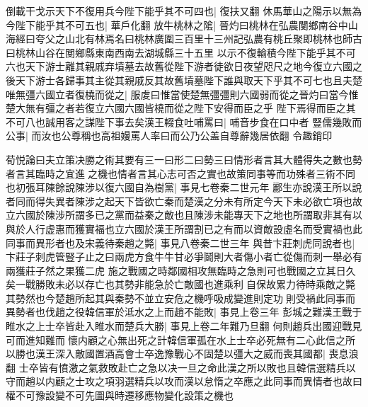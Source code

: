 倒載干戈示天下不復用兵今陛下能乎其不可四也|{
	復扶又翻}
休馬華山之陽示以無為今陛下能乎其不可五也|{
	華戶化翻}
放牛桃林之隂|{
	晉灼曰桃林在弘農閺鄉南谷中山海經曰夸父之山北有林焉名曰桃林廣圍三百里十三州記弘農有桃丘聚即桃林也師古曰桃林山谷在閺鄉縣東南西南去湖城縣三十五里}
以示不復輸積今陛下能乎其不可六也天下游士離其親戚弃墳墓去故舊從陛下游者徒欲日夜望咫尺之地今復立六國之後天下游士各歸事其主從其親戚反其故舊墳墓陛下誰與取天下乎其不可七也且夫楚唯無彊六國立者復橈而從之|{
	服䖍曰惟當使楚無彊彊則六國弱而從之晉灼曰當今惟楚大無有彊之者若復立六國六國皆橈而從之陛下安得而臣之乎}
陛下焉得而臣之其不可八也誠用客之謀陛下事去矣漢王輟食吐哺罵曰|{
	哺音步食在口中者}
豎儒幾敗而公事|{
	而汝也公尊稱也高祖嫚罵人率曰而公乃公盖自尊辭幾居依翻}
令趣銷印

荀悦論曰夫立策决勝之術其要有三一曰形二曰勢三曰情形者言其大體得失之數也勢者言其臨時之宜進之機也情者言其心志可否之實也故策同事等而功殊者三術不同也初張耳陳餘說陳涉以復六國自為樹黨|{
	事見七卷秦二世元年}
酈生亦說漢王所以說者同而得失異者陳涉之起天下皆欲亡秦而楚漢之分未有所定今天下未必欲亡項也故立六國於陳涉所謂多已之黨而益秦之敵也且陳涉未能專天下之地也所謂取非其有以與於人行虚惠而獲實福也立六國於漢王所謂割已之有而以資敵設虛名而受實禍也此同事而異形者也及宋義待秦趙之斃|{
	事見八卷秦二世三年}
與昔卞莊刺虎同說者也|{
	卞莊子刺虎管豎子止之曰兩虎方食牛牛甘必爭鬬則大者傷小者亡從傷而刺一舉必有兩獲莊子然之果獲二虎}
施之戰國之時鄰國相攻無臨時之急則可也戰國之立其日久矣一戰勝敗未必以存亡也其勢非能急於亡敵國也進乘利自保故累力待時乘敵之斃其勢然也今楚趙所起其與秦勢不並立安危之機呼吸成變進則定功則受禍此同事而異勢者也伐趙之役韓信軍於泜水之上而趙不能敗|{
	事見上卷三年}
彭城之難漢王戰于睢水之上士卒皆赴入睢水而楚兵大勝|{
	事見上卷二年難乃旦翻}
何則趙兵出國迎戰見可而進知難而懷内顧之心無出死之計韓信軍孤在水上士卒必死無有二心此信之所以勝也漢王深入敵國置酒高會士卒逸豫戰心不固楚以彊大之威而喪其國都|{
	喪息浪翻}
士卒皆有憤激之氣救敗赴亡之急以决一旦之命此漢之所以敗也且韓信選精兵以守而趙以内顧之士攻之項羽選精兵以攻而漢以怠惰之卒應之此同事而異情者也故曰權不可豫設變不可先圖與時遷移應物變化設策之機也

